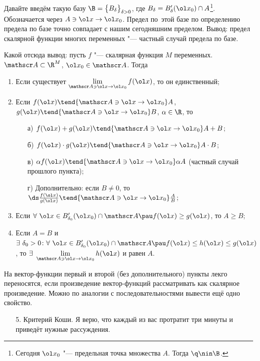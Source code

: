 \documentclass[a4paper,10pt,twoside]{article}
\begin{document}
	 Давайте введём такую базу $\B = \big\{B_\delta\big\}_{\delta>0}$, где $B_\delta = B'_\delta(\ol x_0)\cap A$\footnote{Сегодня 
	 $\ol x_0$ "--- предельная точка множества $A$. Тогда $\q\nin \B$.}. Обозначается через $A\ni \ol x\to \ol x_0$.
	 Предел по~этой базе по определению предела по базе точно совпадает с нашим сегодняшним пределом. Вывод: предел скалярной функции многих переменных "--- 
	 частный случай предела по базе.
	 
	 Какой отсюда вывод: пусть $f$ "--- скалярная функция $M$ переменных. $\mathscr A\subset \R^M$, $\ol x_0\in \mathscr A$. Тогда
	 \begin{enumerate}
	   \item Если существует $\lim\limits_{\mathscr A\ni\ol x\to \ol x_0}f(\ol x)$, то он единственный;
	   \item Если $f(\ol x)\tend{\mathscr A\ni \ol x\to \ol x_0}A$, $g(\ol x)\tend{\mathscr A\ni\ol x\to \ol x_0}B$, $\alpha \in\R$, то
	     \begin{itemize}
	       \item [а)] $f(\ol x) + g(\ol x)\tend{\mathscr A\ni \ol x\to \ol x_0}A + B$;
	       \item [б)] $f(\ol x)\cdot g(\ol x)\tend{\mathscr A\ni \ol x\to \ol x_0} A\cdot B$;
	       \item [в)] $\alpha f(\ol x)\tend{\mathscr A\ni \ol x\to \ol x_0}\alpha A$ (частный случай прошлого пункта);
	       \item [г)] Дополнительно: если $B\neq 0$, то $\ds\frac{f(\ol x)}{g(\ol x)}\tend{\mathscr A\ni \ol x\to \ol x_0}\frac{A}{B}$;
	   \end{itemize}
	   \item Если $\forall\ \ol x\in B'_{\delta_0}(\ol x_0)\cap \mathscr A\pau f(\ol x)\ge g(\ol x)$, то $A\ge B$;
	   \item Если $A = B$ и $\exists\ \delta_0 > 0\colon \forall \ \ol x\in B'_{\delta_0}(\ol x_0)\cap \mathscr A\pau f(\ol x)\le h(\ol x)\le g(\ol x)$,
	   то $\exists\ \lim\limits_{\mathscr A\ni\ol x\to \ol x_0}h(\ol x)$ и равен $A$.
	 \end{enumerate}
	 На вектор-функции первый и второй (без дополнительного) пункты лекго переносятся, если произведение вектор-функций рассматривать как скалярное произведение.
	 Можно по аналогии с последовательностями вывести ещё одно свойство.
	 \begin{itemize}
	   \item [5.] Критерий Коши. Я верю, что каждый из вас протратит три минуты и приведёт нужные рассуждения.
	 \end{itemize}
\end{document}
